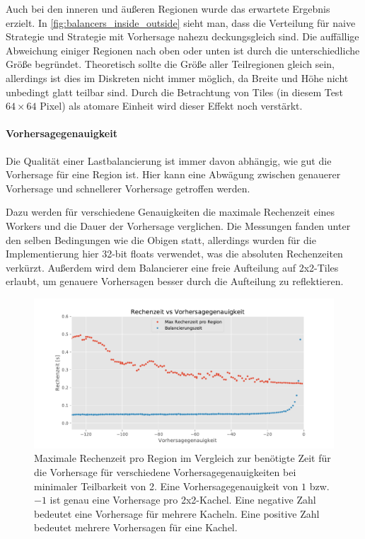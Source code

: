 Auch bei den inneren und äußeren Regionen wurde das erwartete Ergebnis erzielt.
In \autoref{fig:balancers_inside_outside} sieht man, dass die Verteilung für naive Strategie und Strategie mit Vorhersage nahezu deckungsgleich sind.
Die auffällige Abweichung einiger Regionen nach oben oder unten ist durch die unterschiedliche Größe begründet.
Theoretisch sollte die Größe aller Teilregionen gleich sein, allerdings ist dies im Diskreten nicht immer möglich, da Breite und Höhe nicht unbedingt glatt teilbar sind.
Durch die Betrachtung von Tiles (in diesem Test $64\times64$ Pixel) als atomare Einheit wird dieser Effekt noch verstärkt.

\paragraph{Vorhersagegenauigkeit}

Die Qualität einer Lastbalancierung ist immer davon abhängig, wie gut die Vorhersage für eine Region ist.
Hier kann eine Abwägung zwischen genauerer Vorhersage und schnellerer Vorhersage getroffen werden.

Dazu werden für verschiedene Genauigkeiten die maximale Rechenzeit eines Workers und die Dauer der Vorhersage verglichen.
Die Messungen fanden unter den selben Bedingungen wie die Obigen statt, allerdings wurden für die Implementierung hier 32-bit floats verwendet, was die absoluten Rechenzeiten verkürzt.
Außerdem wird dem Balancierer eine freie Aufteilung auf 2x2-Tiles erlaubt, um genauere Vorhersagen besser durch die Aufteilung zu reflektieren.

\begin{figure}
	\centering
	\includegraphics[width=0.9\linewidth]{img/Evaluation/prediction_accuracy_tile2_cropped.pdf}
	\caption{Maximale Rechenzeit pro Region im Vergleich zur benötigte Zeit für die Vorhersage für verschiedene Vorhersagegenauigkeiten bei minimaler Teilbarkeit von 2.
		Eine Vorhersagegenauigkeit von $1$ bzw. $-1$ ist genau eine Vorhersage pro 2x2-Kachel. Eine negative Zahl bedeutet eine Vorhersage für mehrere Kacheln. Eine positive Zahl bedeutet mehrere Vorhersagen für eine Kachel.}
	\label{fig:balancers_prediction_accuracy}
\end{figure}


